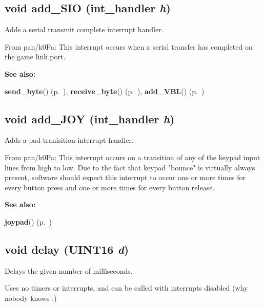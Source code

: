 \subsection{\setlength{\rightskip}{0pt plus 5cm}void add\_\-SIO ({\bf int\_\-handler} {\em h})}

Adds a serial transmit complete interrupt handler.

From pan/k0Pa: This interrupt occurs when a serial transfer has completed on the game link port.

\begin{Desc}
\item[{\bf See also: }]\par
{\bf send\_\-byte}() {\rm (p.~\pageref{gb.h_a65})}, {\bf receive\_\-byte}() {\rm (p.~\pageref{gb.h_a66})}, {\bf add\_\-VBL}() {\rm (p.~\pageref{gb.h_a58})} \end{Desc}
\label{gb.h_a62}
\subsection{\setlength{\rightskip}{0pt plus 5cm}void add\_\-JOY ({\bf int\_\-handler} {\em h})}

Adds a pad tranisition interrupt handler.

From pan/k0Pa: This interrupt occurs on a transition of any of the keypad input lines from high to low. Due to the fact that keypad "bounce" is virtually always present, software should expect this interrupt to occur one or more times for every button press and one or more times for every button release.

\begin{Desc}
\item[{\bf See also: }]\par
{\bf joypad}() {\rm (p.~\pageref{gb.h_a68})} \end{Desc}
\label{gb.h_a67}
\subsection{\setlength{\rightskip}{0pt plus 5cm}void delay ({\bf UINT16} {\em d})}

Delays the given number of milliseconds.

Uses no timers or interrupts, and can be called with interrupts disabled (why nobody knows :) \label{gb.h_a68}
